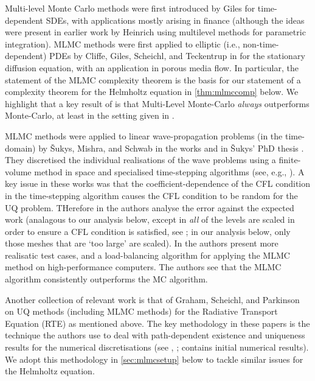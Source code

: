 Multi-level Monte Carlo methods were first introduced by Giles \cite{Gi:08} for time-dependent SDEs, with applications mostly arising in finance (although the ideas were present in earlier work by Heinrich \cite{He:98.He:01} using multilevel methods for parametric integration). MLMC methods were first applied to elliptic (i.e., non-time-dependent) PDEs by Cliffe, Giles, Scheichl, and Teckentrup in \cite{ClGiScTe:11} for the stationary diffusion equation, with an application in porous media flow. In particular, the statement of the MLMC complexity theorem \cite[Theorem 1]{ClGiScTe:11} is the basis for our statement of a complexity theorem for the Helmholtz equation in \cref{thm:mlmccomp} below. We highlight that a key result of \cite[Theorem 1]{ClGiScTe:11} is that Multi-Level Monte-Carlo \emph{always} outperforms Monte-Carlo, at least in the setting given in \cite{ClGiScTe:11}.

MLMC methods were applied to linear wave-propagation problems (in the time-domain) by \v{S}ukys, Mishra, and Schwab in the works \cite{SuMiSc:13,SuMiSc:16} and in \v{S}ukys' PhD thesis \cite{Su:14}. They discretised the individual realisations of the wave problems using a finite-volume method in space and specialised time-stepping algorithms (see, e.g., \cite[Section 3.1]{SuMiSc:16}). A key issue in these works was that the coefficient-dependence of the CFL condition in the time-stepping algorithm causes the CFL condition to be random for the UQ problem. THerefore in \cite{SuMiSc:13} the authors analyse the error against the expected work (analagous to our analysis below, except in \cite{SuMiSc:13} \emph{all} of the levels are scaled in order to ensure a CFL condition is satisfied, see \cite[Text following Theorem 5]{SuMiSc:13}; in our analysis below, only those meshes that are `too large' are scaled). In \cite{SuMiSc:16} the authors present more realisatic test cases, and a load-balancing algorithm for applying the MLMC method on high-performance computers. The authors see that the MLMC algorithm consistently outperforms the MC algorithm.

Another collection of relevant work is that of Graham, Scheichl, and Parkinson \cite{GrScPa:17,Pa:18,GrScPa:19} on UQ methods (including MLMC methods) for the Radiative Transport Equation (RTE) as mentioned above. The key methodology in these papers is the technique the authors use to deal with path-dependent existence and uniqueness results for the numerical discretisations (see \cite[Chapter 4]{Pa:18}, \cite[Definition 5.5 ff.]{GrScPa:19}; \cite{GrScPa:17} contains initial numerical results). We adopt this methodology in \cref{sec:mlmcsetup} below to tackle similar issues for the Helmholtz equation.

